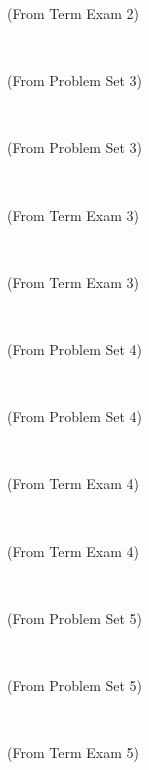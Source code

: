 \documentclass[12pt, letterpaper]{article}
\begin{document}
\begin{problem}
(From Term Exam 2)
\end{problem}

\vfill ~

\clearpage

\begin{problem}
(From Problem Set 3)
\end{problem}

\vfill ~

\begin{problem}
(From Problem Set 3)
\end{problem}

\vfill ~

\begin{problem}
(From Term Exam 3)
\end{problem}

\vfill ~

\begin{problem}
(From Term Exam 3)
\end{problem}

\vfill ~

\clearpage

\begin{problem}
(From Problem Set 4)
\end{problem}

\vfill ~

\begin{problem}
(From Problem Set 4)
\end{problem}

\vfill ~

\begin{problem}
(From Term Exam 4)
\end{problem}

\vfill ~

\begin{problem}
(From Term Exam 4)
\end{problem}

\vfill ~

\clearpage

\begin{problem}
(From Problem Set 5)
\end{problem}

\vfill ~

\begin{problem}
(From Problem Set 5)
\end{problem}

\vfill ~

\begin{problem}
(From Term Exam 5)
\end{problem}
\end{document}
